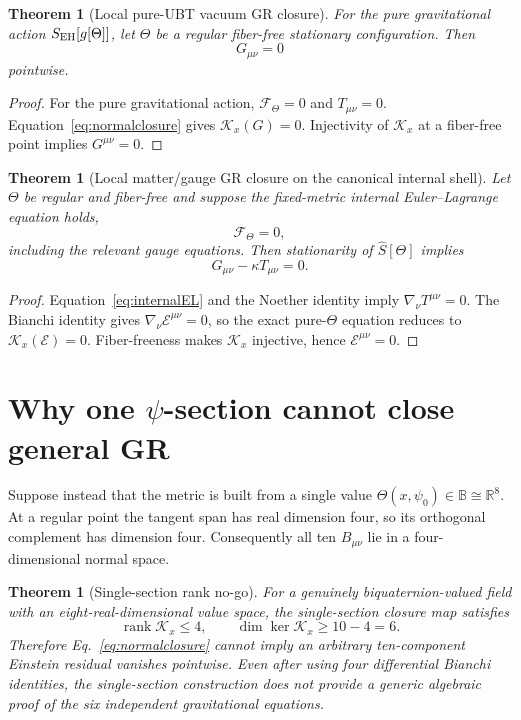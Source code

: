 \documentclass[11pt,a4paper]{article}
\newtheorem{theorem}[definition]{Theorem}
\theoremstyle{remark}
\newcommand{\B}{\mathbb B}
\newcommand{\E}{\mathscr E}
\newcommand{\F}{\mathscr F}
\begin{document}
\begin{theorem}[Local pure-UBT vacuum GR closure]
For the pure gravitational action $S_{\rm EH}[g[\Theta]]$, let $\Theta$ be a
regular fiber-free stationary configuration.  Then
\begin{equation}
  G_{\mu\nu}=0
\end{equation}
pointwise.
\end{theorem}

\begin{proof}
For the pure gravitational action, $\F_\Theta=0$ and $T_{\mu\nu}=0$.
Equation~\eqref{eq:normalclosure} gives
$\mathcal K_x(G)=0$.  Injectivity of $\mathcal K_x$ at a fiber-free point
implies $G^{\mu\nu}=0$.
\end{proof}

\begin{theorem}[Local matter/gauge GR closure on the canonical internal shell]
Let $\Theta$ be regular and fiber-free and suppose the fixed-metric internal
Euler--Lagrange equation holds,
\begin{equation}
  \F_\Theta=0,
  \label{eq:internalEL}
\end{equation}
including the relevant gauge equations.  Then stationarity of
$\widehat S[\Theta]$ implies
\begin{equation}
  G_{\mu\nu}-\kappa T_{\mu\nu}=0.
\end{equation}
\end{theorem}

\begin{proof}
Equation~\eqref{eq:internalEL} and the Noether identity imply
$\nabla_\nu T^{\mu\nu}=0$.  The Bianchi identity gives
$\nabla_\nu\E^{\mu\nu}=0$, so the exact pure-$\Theta$ equation reduces to
$\mathcal K_x(\E)=0$.  Fiber-freeness makes $\mathcal K_x$ injective, hence
$\E^{\mu\nu}=0$.
\end{proof}

\section{Why one $\psi$-section cannot close general GR}

Suppose instead that the metric is built from a single value
$\Theta(x,\psi_0)\in\B\cong\mathbb R^8$.  At a regular point the tangent span has
real dimension four, so its orthogonal complement has dimension four.
Consequently all ten $B_{\mu\nu}$ lie in a four-dimensional normal space.

\begin{theorem}[Single-section rank no-go]
For a genuinely biquaternion-valued field with an eight-real-dimensional value
space, the single-section closure map satisfies
\begin{equation}
  \operatorname{rank}\mathcal K_x\le4,
  \qquad
  \dim\ker\mathcal K_x\ge 10-4=6.
\end{equation}
Therefore Eq.~\eqref{eq:normalclosure} cannot imply an arbitrary ten-component
Einstein residual vanishes pointwise.  Even after using four differential
Bianchi identities, the single-section construction does not provide a generic
algebraic proof of the six independent gravitational equations.
\end{theorem}
\end{document}
